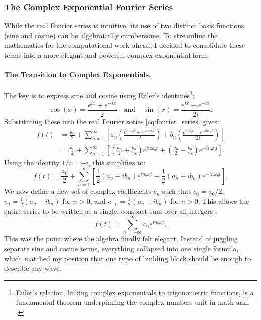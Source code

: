 \documentclass{article}
\begin{document}
    \subsubsection{The Complex Exponential Fourier Series}

While the real Fourier series is intuitive, its use of two distinct basis functions (sine and cosine) can be algebraically cumbersome. To streamline the mathematics for the computational work ahead, I decided to consolidate these terms into a more elegant and powerful complex exponential form.

\paragraph{The Transition to Complex Exponentials.}
The key is to express sine and cosine using Euler's identities\footnote{Euler's relation, linking complex exponentials to trigonometric functions, is a fundamental theorem underpinning the complex numbers unit in math aahl \cite{haese_math_hl, haese_aa_hl}.}:
\[
    \cos(x) = \frac{e^{ix} + e^{-ix}}{2} \quad \text{and} \quad \sin(x) = \frac{e^{ix} - e^{-ix}}{2i}.
\]
Substituting these into the real Fourier series \eqref{eq:fourier_series} gives:
\begin{align*}
    f(t) &= \frac{a_0}{2} + \sum_{n=1}^{\infty} \left[ a_n \left( \frac{e^{in\omega_0 t} + e^{-in\omega_0 t}}{2} \right) + b_n \left( \frac{e^{in\omega_0 t} - e^{-in\omega_0 t}}{2i} \right) \right] \\
    &= \frac{a_0}{2} + \sum_{n=1}^{\infty} \left[ \left( \frac{a_n}{2} + \frac{b_n}{2i} \right) e^{in\omega_0 t} + \left( \frac{a_n}{2} - \frac{b_n}{2i} \right) e^{-in\omega_0 t} \right].
\end{align*}
Using the identity $1/i = -i$, this simplifies to:
\[
    f(t) = \frac{a_0}{2} + \sum_{n=1}^{\infty} \left[ \frac{1}{2}(a_n - ib_n) e^{in\omega_0 t} + \frac{1}{2}(a_n + ib_n) e^{-in\omega_0 t} \right].
\]
We now define a new set of complex coefficients $c_n$ such that $c_0 = a_0/2$, $c_n = \frac{1}{2}(a_n - ib_n)$ for $n>0$, and $c_{-n} = \frac{1}{2}(a_n + ib_n)$ for $n>0$. This allows the entire series to be written as a single, compact sum over all integers \cite{stein2003fourier}:
\begin{equation}
    f(t) = \sum_{n=-\infty}^{\infty} c_n e^{in\omega_0 t}.
    \label{eq:complex_fourier_series}
\end{equation}
This was the point where the algebra finally felt elegant. Instead of juggling separate sine and cosine terms, everything collapsed into one single formula, which matched my position that one type of building block should be enough to describe any wave.
\end{document}
